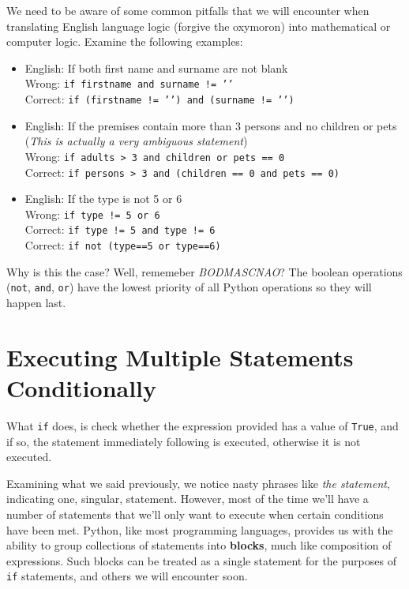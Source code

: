 We need to be aware of some common pitfalls that we will encounter   when translating English language logic (forgive the oxymoron) into   mathematical or computer logic. Examine the following examples:
\begin{itemize}
	\item English: If both first name and surname are not blank
\\     Wrong: \texttt{if firstname and surname != '{}'}    
\\     Correct: \texttt{if (firstname != '{}') and (surname != '{}')}   
	\item English: If the premises contain more than 3 persons and no    children or pets (\textit{This is actually a very ambiguous statement})
\\     Wrong: \texttt{if adults > 3 and children or pets == 0}    
\\     Correct: \texttt{if persons > 3 and (children == 0 and pets == 0)}    
	\item English: If the type is not 5 or 6
\\     Wrong: \texttt{if type != 5 or 6}    
\\     Correct: \texttt{if type != 5 and type != 6}
\\     Correct: \texttt{if not (type==5 or type==6)}     
\end{itemize}

Why is this the case? Well, rememeber \textit{BODMASCNAO}? The boolean operations (\texttt{not}, \texttt{and}, \texttt{or}) have the lowest priority of all Python operations so they                 will happen last.

\section{Executing Multiple Statements Conditionally}     What \texttt{if} does, is check whether the expression provided has a    value of \texttt{True}, and if so, the statement immediately    following is executed, otherwise it is not executed.    

Examining what we said previously, we notice nasty phrases like \textit{the   statement}, indicating one, singular, statement. However, most of the   time we'll have a number of statements that we'll only want to execute when certain   conditions have been met. Python, like most programming languages,   provides us with the ability to group collections of statements into   \textbf{blocks}, much like composition of expressions. Such   blocks can be treated as a single statement for the purposes of \texttt{if}   statements, and others we will encounter soon.

